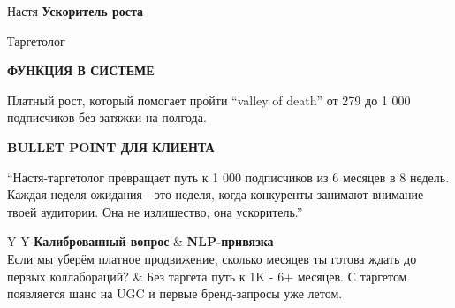 \documentclass[11pt,a4paper]{article}
\newcommand{\minititle}[1]{{\sansfont\bfseries\fontsize{9.5}{11}\selectfont\color{rose}\MakeUppercase{#1}}}
\begin{document}
\begin{glassbox}
{\headingfont\fontsize{18}{20}\selectfont Настя}\hfill
{\sansfont\bfseries\color{emerald} Ускоритель роста}

{\color{muted} Таргетолог}

\vspace{2mm}
\begin{softbox}[colback=paperbg]
\minititle{Функция в системе}\par
Платный рост, который помогает пройти ``valley of death'' от 279 до 1 000 подписчиков без затяжки на полгода.
\end{softbox}
\vspace{2mm}
\begin{softbox}[colback=paperbg]
\minititle{Bullet Point для клиента}\par
``Настя-таргетолог превращает путь к 1 000 подписчиков из 6 месяцев в 8 недель. Каждая неделя ожидания - это неделя, когда конкуренты занимают внимание твоей аудитории. Она не излишество, она ускоритель.''
\end{softbox}
\vspace{2mm}
\begin{tabularx}{\linewidth}{Y Y}
\textbf{Калиброванный вопрос} & \textbf{NLP-привязка} \\
Если мы уберём платное продвижение, сколько месяцев ты готова ждать до первых коллабораций? & Без таргета путь к 1K - 6+ месяцев. С таргетом появляется шанс на UGC и первые бренд-запросы уже летом. \\
\end{tabularx}
\end{glassbox}

\vspace{3mm}
\end{document}
